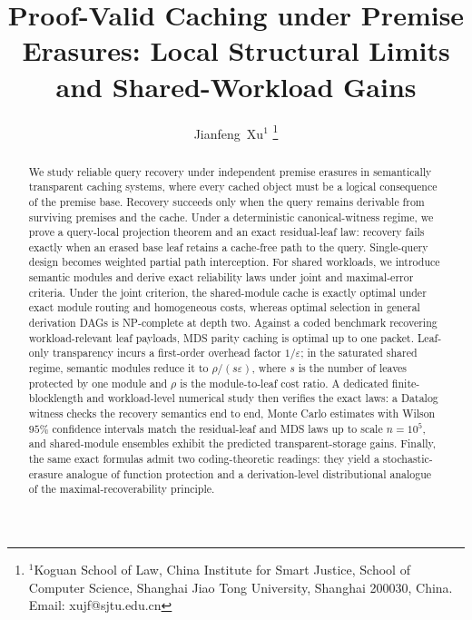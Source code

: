 \documentclass[journal]{IEEEtran}
\numberwithin{equation}{section}
\begin{document}
\title{Proof-Valid Caching under Premise Erasures: Local Structural Limits and Shared-Workload Gains}

\author{Jianfeng~Xu$^{1}$%
\thanks{$^{1}$Koguan School of Law, China Institute for Smart Justice,
School of Computer Science, Shanghai Jiao Tong University,
Shanghai 200030, China. Email: xujf@sjtu.edu.cn}%
}

\maketitle

\begin{abstract}
We study reliable query recovery under independent premise erasures in
semantically transparent caching systems, where every cached object must be
a logical consequence of the premise base.  Recovery succeeds only when the
query remains derivable from surviving premises and the cache.  Under a
deterministic canonical-witness regime, we prove a query-local projection
theorem and an exact residual-leaf law: recovery fails exactly when an
erased base leaf retains a cache-free path to the query.  Single-query
design becomes weighted partial path interception.
For shared workloads, we introduce semantic modules and derive exact
reliability laws under joint and maximal-error criteria.  Under the joint
criterion, the shared-module cache is exactly optimal under exact module
routing and homogeneous costs, whereas optimal selection in general
derivation DAGs is NP-complete at depth two.  Against a coded benchmark
recovering workload-relevant leaf payloads, MDS parity caching is optimal
up to one packet.  Leaf-only transparency incurs a first-order overhead
factor \(1/\varepsilon\); in the saturated shared regime, semantic modules
reduce it to \(\rho/(s\varepsilon)\), where \(s\) is the number of leaves
protected by one module and \(\rho\) is the module-to-leaf cost ratio.
A dedicated finite-blocklength and workload-level numerical study then
verifies the exact laws: a Datalog witness checks the recovery semantics
end to end, Monte Carlo estimates with Wilson \(95\%\) confidence intervals
match the residual-leaf and MDS laws up to scale \(n=10^{5}\), and
shared-module ensembles exhibit the predicted transparent-storage gains.
Finally, the same exact formulas admit two coding-theoretic readings: they
yield a stochastic-erasure analogue of function protection and a
derivation-level distributional analogue of the maximal-recoverability
principle.
\end{abstract}
\end{document}
